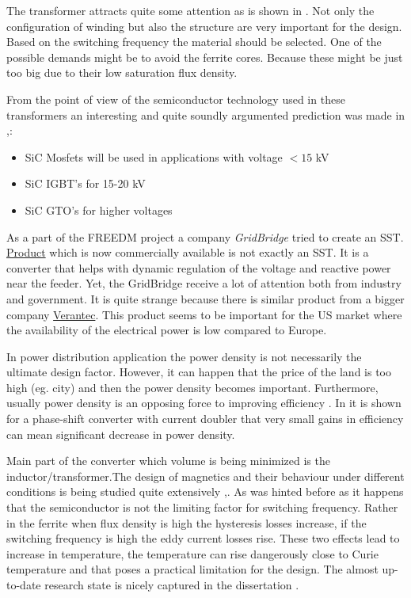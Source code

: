 \documentclass[]{scrartcl}
\begin{document}
The transformer attracts quite some attention as is shown in \cite{Huang2013}. Not only the configuration of winding but also the structure are very important for the design. Based on the switching frequency the material should be selected. One of the possible demands might be to avoid the ferrite cores. Because these might be just too big due to their low saturation flux density. 

From the point of view of the semiconductor technology used in these transformers an interesting and quite soundly argumented prediction was made in \cite{Huang2013},\cite{Rohm2014}:

\begin{itemize}
	\item SiC Mosfets will be used in applications with voltage $<15$ kV
	\item SiC IGBT's for 15-20 kV
	\item SiC GTO's for higher voltages
\end{itemize}



As a part of the FREEDM project a company \emph{GridBridge} tried to create an SST. \href{<http://www.grid-bridge.com/products-2/>}{Product} which is now commercially available is not exactly an SST. It is a converter that helps with dynamic regulation of the voltage and reactive power near the feeder. Yet, the GridBridge receive a lot of attention both from industry and government. It is quite strange because there is similar product from a bigger company \href{<http://varentec.com/products/engo-v10/>}{Verantec}. This product seems to be important for the US market where the availability of the electrical power is low compared to Europe.



In power distribution application the power density is not necessarily the ultimate design factor. However, it can happen that the price of the land is too high (eg. city) and then the power density becomes important. Furthermore, usually power density is an opposing force to improving efficiency \cite{Biela2009}. In \cite{Biela2009} it is shown for a phase-shift converter with current doubler that very small gains in efficiency can mean significant decrease in power density. 



Main part of the converter which volume is being minimized is the inductor/transformer.The design of magnetics and their behaviour under different conditions is being studied quite extensively \cite{Su2011},\cite{Mu2014}. As was hinted before as it  happens that the semiconductor is not the limiting factor for switching frequency. Rather in the ferrite when flux density is high the hysteresis losses increase, if the switching frequency is high the eddy current losses rise. These two effects lead to increase in temperature, the temperature can rise dangerously close to Curie temperature and that poses a practical limitation for the design. The almost up-to-date research state is nicely captured in the dissertation \cite{Shen2006}. 
\end{document}
